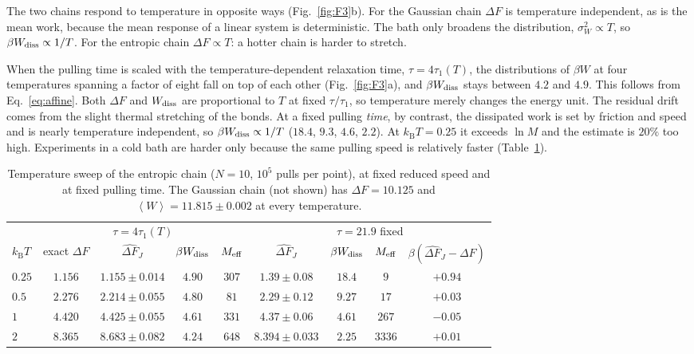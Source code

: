 \documentclass[11pt,a4paper]{article}
\newcommand{\kT}{k_{\mathrm B}T}
\newcommand{\avg}[1]{\left\langle #1\right\rangle}
\newcommand{\Wd}{W_{\rm diss}}
\newcommand{\dFJ}{\widehat{\Delta F}_J}
\begin{document}
The two chains respond to temperature in opposite ways (Fig.~\ref{fig:F3}b). For the Gaussian chain $\Delta F$
is temperature independent, as is the mean work, because the mean response of a linear system is
deterministic. The bath only broadens the distribution, $\sigma_W^2\propto T$, so $\beta\Wd\propto1/T$. For
the entropic chain $\Delta F\propto T$: a hotter chain is harder to stretch.

When the pulling time is scaled with the temperature-dependent relaxation time, $\tau=4\tau_1(T)$, the
distributions of $\beta W$ at four temperatures spanning a factor of eight fall on top of each other
(Fig.~\ref{fig:F3}a), and $\beta\Wd$ stays between $4.2$ and $4.9$. This follows from Eq.~\eqref{eq:affine}.
Both $\Delta F$ and $\Wd$ are proportional to $T$ at fixed $\tau/\tau_1$, so temperature merely changes the energy
unit. The residual drift comes from the slight thermal stretching of the bonds. At a fixed pulling
\emph{time}, by contrast, the dissipated work is set by friction and speed and is nearly temperature
independent, so $\beta\Wd\propto1/T$ ($18.4$, $9.3$, $4.6$, $2.2$). At $\kT=0.25$ it exceeds $\ln M$ and the
estimate is $20\%$ too high. Experiments in a cold bath are harder only because the same pulling speed is
relatively faster (Table~\ref{tab:F3}).

\begin{table}[h]
\centering\small\setlength{\tabcolsep}{4pt}
\begin{tabular}{l|cccc|cccc}
\toprule
& \multicolumn{4}{c|}{$\tau=4\tau_1(T)$} & \multicolumn{4}{c}{$\tau=21.9$ fixed}\\
$\kT$ & exact $\Delta F$ & $\dFJ$ & $\beta\Wd$ & $M_{\rm eff}$ & $\dFJ$ & $\beta\Wd$ & $M_{\rm eff}$ & $\beta(\dFJ-\Delta F)$\\
\midrule
$0.25$ & $1.156$ & $1.155\pm0.014$ & $4.90$ & $307$ & $1.39\pm0.08$ & $18.4$ & $9$ & $+0.94$\\
$0.5$ & $2.276$ & $2.214\pm0.055$ & $4.80$ & $81$ & $2.29\pm0.12$ & $9.27$ & $17$ & $+0.03$\\
$1$ & $4.420$ & $4.425\pm0.055$ & $4.61$ & $331$ & $4.37\pm0.06$ & $4.61$ & $267$ & $-0.05$\\
$2$ & $8.365$ & $8.683\pm0.082$ & $4.24$ & $648$ & $8.394\pm0.033$ & $2.25$ & $3336$ & $+0.01$\\
\bottomrule
\end{tabular}
\caption{Temperature sweep of the entropic chain ($N=10$, $10^5$ pulls per point), at fixed reduced speed
and at fixed pulling time. The Gaussian chain (not shown) has $\Delta F=10.125$ and $\avg W=11.815\pm0.002$ at every
temperature.}
\label{tab:F3}
\end{table}
\end{document}
